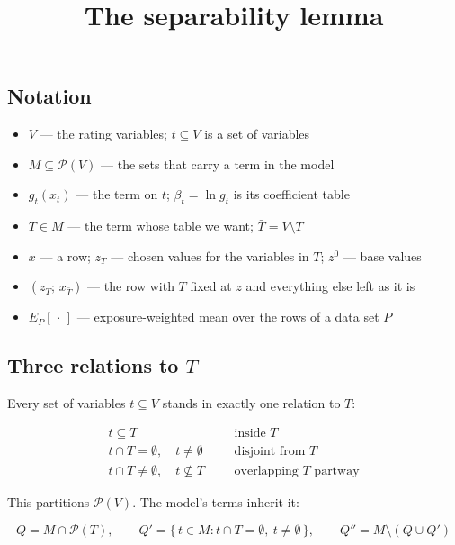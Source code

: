 \documentclass[
  letterpaper,
  DIV=11,
  numbers=noendperiod]{scrartcl}
\title{The separability lemma}
\author{}
\date{}
\providecommand{\tightlist}{%
  \setlength{\itemsep}{0pt}\setlength{\parskip}{0pt}}
\begin{document}
\maketitle


\subsection{Notation}\label{notation}

\begin{itemize}
\tightlist
\item
  \(V\) --- the rating variables; \(t \subseteq V\) is a set of
  variables
\item
  \(M \subseteq \mathcal{P}(V)\) --- the sets that carry a term in the
  model
\item
  \(g_t(x_t)\) --- the term on \(t\); \(\beta_t = \ln g_t\) is its
  coefficient table
\item
  \(T \in M\) --- the term whose table we want;
  \(\bar{T} = V \setminus T\)
\item
  \(x\) --- a row; \(z_T\) --- chosen values for the variables in \(T\);
  \(z^0\) --- base values
\item
  \((z_T;\, x_{\bar{T}})\) --- the row with \(T\) fixed at \(z\) and
  everything else left as it is
\item
  \(E_P[\,\cdot\,]\) --- exposure-weighted mean over the rows of a data
  set \(P\)
\end{itemize}

\subsection{\texorpdfstring{Three relations to
\(T\)}{Three relations to T}}\label{three-relations-to-t}

Every set of variables \(t \subseteq V\) stands in exactly one relation
to \(T\):

\[
\begin{aligned}
t \subseteq T &&&\text{inside } T\\
t \cap T = \emptyset,\quad t \neq \emptyset &&&\text{disjoint from } T\\
t \cap T \neq \emptyset,\quad t \not\subseteq T &&&\text{overlapping } T \text{ partway}
\end{aligned}
\]

This partitions \(\mathcal{P}(V)\). The model's terms inherit it:

\[
Q = M \cap \mathcal{P}(T), \qquad
Q' = \{\,t \in M : t \cap T = \emptyset,\ t \neq \emptyset\,\}, \qquad
Q'' = M \setminus (Q \cup Q')
\]
\end{document}
